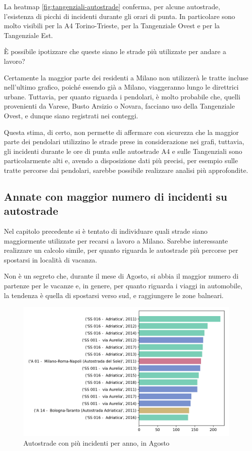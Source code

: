 \documentclass[a4paper,12pt]{report}
\begin{document}
La heatmap \ref{fig:tangenziali-autostrade} conferma, per alcune autostrade, 
l'esistenza di picchi di incidenti durante gli orari di punta. 
In particolare sono molto visibili per la A4 Torino-Trieste, 
per la Tangenziale Ovest e per la Tangenziale Est. 

\`E possibile ipotizzare che queste siano le strade più utilizzate per 
andare a lavoro? 

Certamente la maggior parte dei residenti a Milano non utilizzerà le tratte incluse 
nell'ultimo grafico, poiché essendo già a Milano, viaggeranno lungo le direttrici urbane. 
Tuttavia, per quanto riguarda i pendolari, è molto probabile che, quelli provenienti 
da Varese, Busto Arsizio o Novara, facciano uso della Tangenziale Ovest, 
e dunque siano registrati nei conteggi. 

Questa stima, di certo, non permette di affermare con sicurezza 
che la maggior parte dei pendolari utilizzino le strade prese in considerazione 
nei grafi, 
tuttavia, gli incidenti durante le ore di punta sulle autostrade A4 e sulle 
Tangenziali sono particolarmente alti e, avendo a disposizione dati più 
precisi, per esempio sulle tratte percorse dai pendolari, sarebbe possibile 
realizzare analisi più approfondite. 

\subsection{Annate con maggior numero di incidenti su autostrade}

Nel capitolo precedente si è tentato di individuare quali strade siano maggiormente 
utilizzate per recarsi a lavoro a Milano. 
Sarebbe interessante realizzare un calcolo simile, per quanto riguarda le autostrade 
più percorse per spostarsi in località di vacanza. 

Non è un segreto che, durante il mese di Agosto, si abbia il maggior numero di 
partenze per le vacanze e, in genere, per quanto riguarda i viaggi 
in automobile, la tendenza è quella di spostarsi verso sud, 
e raggiungere le zone balneari. 

\begin{figure}
    \includegraphics[width=\linewidth]{../src/incidenti/incidenti_aci/agosto/autostrade_anno_agosto.png}
    \caption{Autostrade con più incidenti per anno, in Agosto}
    \label{fig:autostrade-anno-agosto}
\end{figure}
\end{document}
